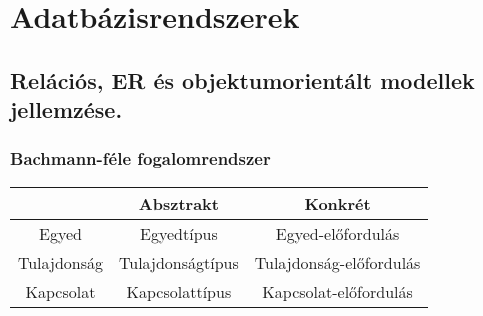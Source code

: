 \section{Adatbázisrendszerek}
\subsection{Relációs, ER és objektumorientált modellek jellemzése.}
\subsubsection{Bachmann-féle fogalomrendszer}
\begin{tabular}{|c|c|c|}
	\hline 
	& Absztrakt & Konkrét \\ 
	\hline 
	Egyed & Egyedtípus & Egyed-előfordulás \\ 
	\hline 
	Tulajdonság & Tulajdonságtípus & Tulajdonság-előfordulás \\ 
	\hline 
	Kapcsolat & Kapcsolattípus & Kapcsolat-előfordulás \\ 
	\hline 
\end{tabular} 
